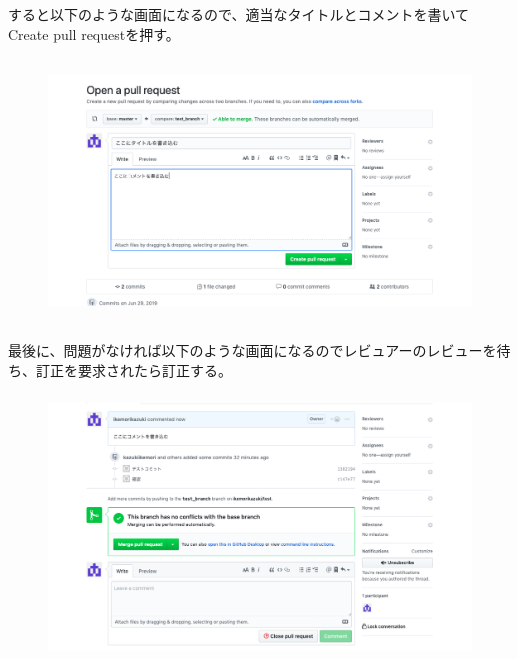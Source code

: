 \documentclass[dvipdfmx]{jsarticle}
\begin{document}
    すると以下のような画面になるので、適当なタイトルとコメントを書いて Create pull requestを押す。
    \begin{figure}[ht]
      \begin{center}
        \includegraphics[width=180mm, height=70mm]{../screenshot/pullrequestcoment.png}
        \caption{}
      \end{center}
    \end{figure}
    最後に、問題がなければ以下のような画面になるのでレビュアーのレビューを待ち、訂正を要求されたら訂正する。
    \begin{figure}[ht]
      \begin{center}
        \includegraphics[width=180mm, height=70mm]{../screenshot/merge.png}
        \caption{}
      \end{center}
    \end{figure}
\end{document}
